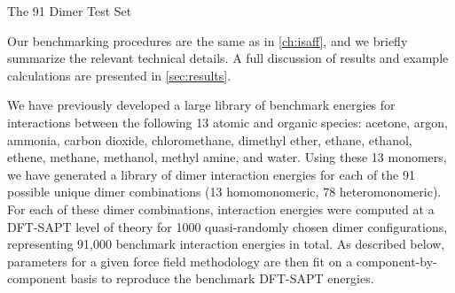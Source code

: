 \begin{subsection}{The 91 Dimer Test Set}

Our benchmarking procedures
are the same as in \cref{ch:isaff},\cite{VanVleet2016}
and we briefly summarize the relevant technical details. A full discussion of
results and example calculations are presented in \cref{sec:results}.

We have previously developed a large library of benchmark energies
for interactions between the following 13 atomic and organic species: acetone, argon, ammonia, carbon dioxide,
chloromethane, dimethyl ether, ethane, ethanol, ethene, methane, methanol,
methyl amine, and water. Using these 13 monomers, we have generated a library of dimer interaction
energies for each of the 91 possible unique dimer combinations (13 homomonomeric, 78
heteromonomeric). For each of these dimer combinations, interaction energies were
computed at a DFT-SAPT
\cite{Misquitta2002,Misquitta2003,Misquitta2005,Heßelmann2005a,Podeszwa2006a,Heßelmann2002,Heßelmann2003,Heßelmann2002a,Jansen2001}
level of theory for 1000 quasi-randomly chosen dimer configurations,
representing 91,000 benchmark interaction energies in total. 
As described below, parameters for a given force field methodology are then
fit on a component-by-component basis to reproduce the benchmark DFT-SAPT energies. 

\end{subsection}
